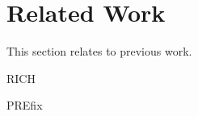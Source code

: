 \section{Related Work}
\label{s:relwk}

This section relates \sys to previous work.

RICH~\cite{brumley:rich}

PREfix~\cite{moy:prefix}
